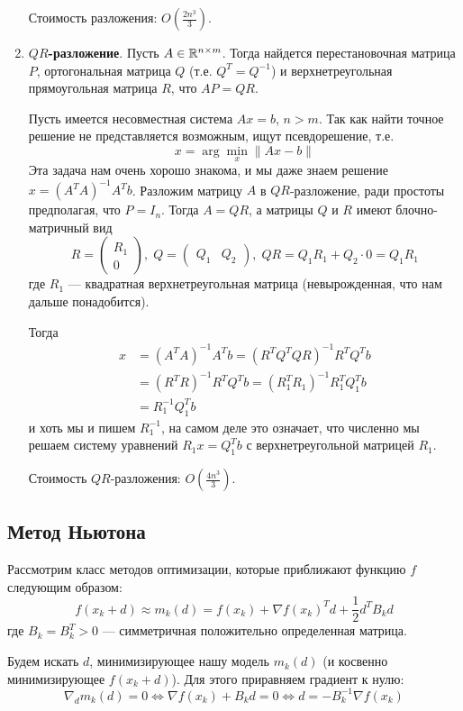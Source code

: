 \documentclass[a4paper, 12pt]{article}
\begin{document}
\begin{enumerate}
    Стоимость разложения: $O\left(\frac{2n^3}{3}\right)$.
    
    \item \textbf{$QR$-разложение}. Пусть $A \in \mathbb{R}^{n \times m}$. Тогда найдется перестановочная матрица $P$, ортогональная матрица $Q$ (т.е. $Q^T = Q^{-1}$) и верхнетреугольная прямоугольная матрица $R$, что $AP = QR$.
    
    Пусть имеется несовместная система $Ax = b$, $n > m$. Так как найти точное решение не представляется возможным, ищут псевдорешение, т.е. $$x = \arg\min_{x} \|Ax - b\|$$ Эта задача нам очень хорошо знакома, и мы даже знаем решение $x = (A^TA)^{-1}A^Tb$. Разложим матрицу $A$ в $QR$-разложение, ради простоты предполагая, что $P = I_n$. Тогда $A = QR$, а матрицы $Q$ и $R$ имеют блочно-матричный вид
    $$R = \left( \begin{matrix}
        R_1 \\
        0
    \end{matrix}\right), \; Q = \left(\begin{matrix}
    Q_1 & Q_2 
    \end{matrix} \right), \; QR = Q_1R_1 + Q_2\cdot 0 = Q_1R_1$$
    где $R_1$ --- квадратная верхнетреугольная матрица (невырожденная, что нам дальше понадобится).
    
    Тогда
    \begin{align}
        x &= (A^TA)^{-1}A^Tb = (R^TQ^TQR)^{-1}R^TQ^Tb \\
          &= (R^TR)^{-1}R^TQ^Tb = (R_1^TR_1)^{-1} R_1^TQ_1^Tb \\
          &= R_1^{-1}Q_1^{T}b
    \end{align}
    и хоть мы и пишем $R_1^{-1}$, на самом деле это означает, что численно мы решаем систему уравнений $R_1x = Q_1^Tb$ с верхнетреугольной матрицей $R_1$.
    
    Стоимость $QR$-разложения: $O\left(\frac{4n^3}{3}\right)$.
    
\end{enumerate}

\subsection{Метод Ньютона}
Рассмотрим класс методов оптимизации, которые приближают функцию $f$ следующим образом:
$$f(x_k + d) \approx m_k(d) = f(x_k) + \nabla f(x_k)^Td + \frac{1}{2} d^T B_k d$$
где $B_k = B_k^T > 0$ --- симметричная положительно определенная матрица.

Будем искать $d$, минимизирующее нашу модель $m_k(d)$ (и косвенно минимизирующее $f(x_k + d)$). Для этого приравняем градиент к нулю:
$$\nabla_d m_k(d) = 0 \Leftrightarrow \nabla f(x_k) + B_k d = 0 \Leftrightarrow d = -B_k^{-1}\nabla f(x_k)$$
\end{document}
